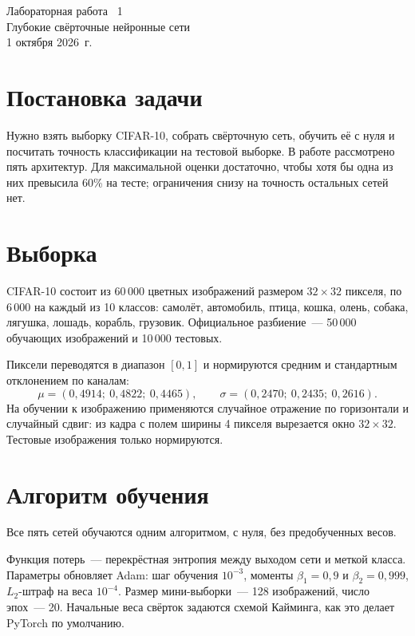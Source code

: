 \documentclass[12pt,a4paper]{article}
\begin{document}
\begin{center}
{\Large Лабораторная работа \textnumero~1}\\[0.4em]
{\large Глубокие свёрточные нейронные сети}\\[0.6em]
1 октября 2026~г.
\end{center}

\section{Постановка задачи}

Нужно взять выборку CIFAR-10, собрать свёрточную сеть, обучить её с нуля и посчитать точность классификации на тестовой выборке. В работе рассмотрено пять архитектур. Для максимальной оценки достаточно, чтобы хотя бы одна из них превысила 60\% на тесте; ограничения снизу на точность остальных сетей нет.

\section{Выборка}

CIFAR-10 состоит из 60\,000 цветных изображений размером $32\times32$ пикселя, по 6\,000 на каждый из 10 классов: самолёт, автомобиль, птица, кошка, олень, собака, лягушка, лошадь, корабль, грузовик. Официальное разбиение~--- 50\,000 обучающих изображений и 10\,000 тестовых.

Пиксели переводятся в диапазон $[0,1]$ и нормируются средним и стандартным отклонением по каналам:
\[
\mu = (0{,}4914;\ 0{,}4822;\ 0{,}4465), \qquad
\sigma = (0{,}2470;\ 0{,}2435;\ 0{,}2616).
\]
На обучении к изображению применяются случайное отражение по горизонтали и случайный сдвиг: из кадра с полем ширины 4 пикселя вырезается окно $32\times32$. Тестовые изображения только нормируются.

\section{Алгоритм обучения}

Все пять сетей обучаются одним алгоритмом, с нуля, без предобученных весов.

Функция потерь~--- перекрёстная энтропия между выходом сети и меткой класса. Параметры обновляет Adam: шаг обучения $10^{-3}$, моменты $\beta_1 = 0{,}9$ и $\beta_2 = 0{,}999$, $L_2$-штраф на веса $10^{-4}$. Размер мини-выборки~--- 128 изображений, число эпох~--- 20. Начальные веса свёрток задаются схемой Кайминга, как это делает PyTorch по умолчанию.
\end{document}

